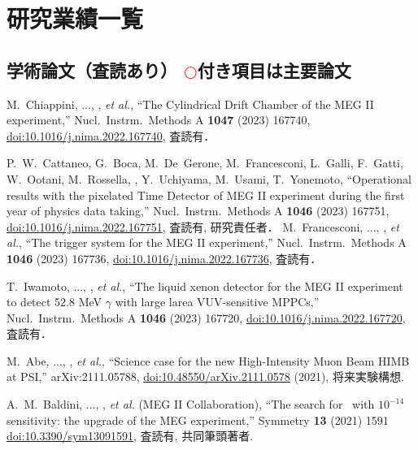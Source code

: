 
\section{研究業績一覧}
	
\subsection{学術論文（査読あり） \textcolor{red}{$\bigcirc$}付き項目は主要論文}

	\begin{enumerate}
			\setlength{\itemsep}{-1pt}


M.~Chiappini, ..., \me, {\it et al.},
``The Cylindrical Drift Chamber of the MEG II experiment,'' Nucl.\ Instrm.\ Methods A {\bf 1047} (2023) 167740,
\href{https://doi.org/10.1016/j.nima.2022.167740}{doi:10.1016/j.nima.2022.167740},
査読有．

P.~W.~Cattaneo, G.~Boca, M.~De~Gerone, M.~Francesconi, L.~Galli, F.~Gatti, W.~Ootani, M.~Rossella, \me, Y.~Uchiyama, M.~Usami, T.~Yonemoto,
``Operational results with the pixelated Time Detector of MEG II experiment during the first year of physics data taking,'' Nucl.\ Instrm.\ Methods A {\bf 1046} (2023) 167751,
\href{https://doi.org/10.1016/j.nima.2022.167751}{doi:10.1016/j.nima.2022.167751},
査読有, 研究責任者．
M.~Francesconi, ..., \me, {\it et al.},
``The trigger system for the MEG II experiment,'' Nucl.\ Instrm.\ Methods A {\bf 1046} (2023) 167736,
\href{https://doi.org/10.1016/j.nima.2022.167736}{doi:10.1016/j.nima.2022.167736},
査読有．

T.~Iwamoto, ..., \me, {\it et al.},
``The liquid xenon detector for the MEG II experiment to detect 52.8 MeV $\gamma$ with large larea VUV-sensitive MPPCs,'' Nucl.\ Instrm.\ Methods A {\bf 1046} (2023) 167720,
\href{https://doi.org/10.1016/j.nima.2022.167720}{doi:10.1016/j.nima.2022.167720},
査読有．


M.~Abe, ..., \me, {\it et al.},
``Science case for the new High-Intensity Muon Beam HIMB at PSI,''
arXiv:2111.05788, 
\href{https://doi.org/10.48550/arXiv.2111.0578}{doi:10.48550/arXiv.2111.0578} 
(2021), 将来実験構想.

A.~M.~Baldini, ..., \me, {\it et al.} (MEG II Collaboration),
``The search for \megc\ with $10^{-14}$ sensitivity: the upgrade of the MEG experiment,''
Symmetry {\bf 13} (2021) 1591
\href{https://doi.org/10.3390/sym13091591}{doi:10.3390/sym13091591}, 
査読有, 共同筆頭著者.


\end{enumerate}
